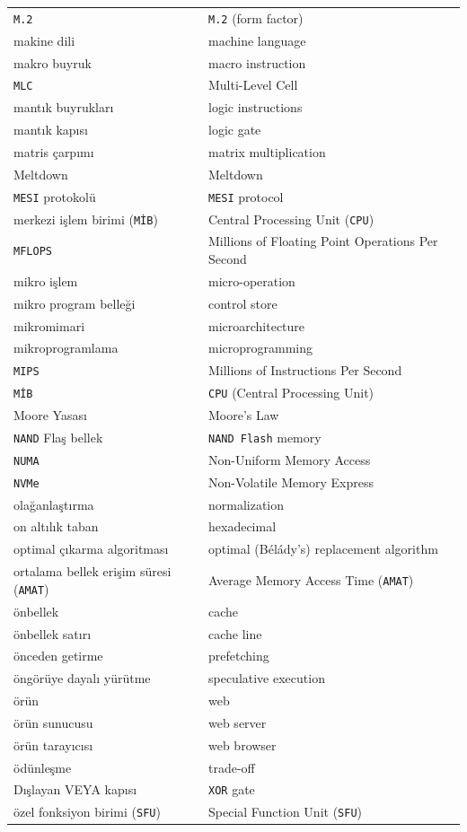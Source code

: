 {\begin{longtable}{@{}p{7.6cm}p{7.6cm}@{}}
\texttt{M.2} & \texttt{M.2} (form factor) \\
makine dili & machine language \\
makro buyruk & macro instruction \\
\texttt{MLC} & Multi-Level Cell \\
mantık buyrukları & logic instructions \\
mantık kapısı & logic gate \\
matris çarpımı & matrix multiplication \\
Meltdown & Meltdown \\
\texttt{MESI} protokolü & \texttt{MESI} protocol \\
merkezi işlem birimi (\texttt{MİB}) & Central Processing Unit (\texttt{CPU}) \\
\texttt{MFLOPS} & Millions of Floating Point Operations Per Second \\
mikro işlem & micro-operation \\
mikro program belleği & control store \\
mikromimari & microarchitecture \\
mikroprogramlama & microprogramming \\
\texttt{MIPS} & Millions of Instructions Per Second \\
\texttt{MİB} & \texttt{CPU} (Central Processing Unit) \\
Moore Yasası & Moore's Law \\

\texttt{NAND} Flaş bellek & \texttt{NAND Flash} memory \\
\texttt{NUMA} & Non-Uniform Memory Access \\
\texttt{NVMe} & Non-Volatile Memory Express \\

olağanlaştırma & normalization \\
on altılık taban & hexadecimal \\
optimal çıkarma algoritması & optimal (Bélády's) replacement algorithm \\
ortalama bellek erişim süresi (\texttt{AMAT}) & Average Memory Access Time (\texttt{AMAT}) \\

önbellek & cache \\
önbellek satırı & cache line \\
önceden getirme & prefetching \\
öngörüye dayalı yürütme & speculative execution \\
örün & web \\
örün sunucusu & web server \\
örün tarayıcısı & web browser \\
ödünleşme & trade-off \\
Dışlayan VEYA kapısı & \texttt{XOR} gate \\
özel fonksiyon birimi (\texttt{SFU}) & Special Function Unit (\texttt{SFU}) \\


\end{longtable}}
